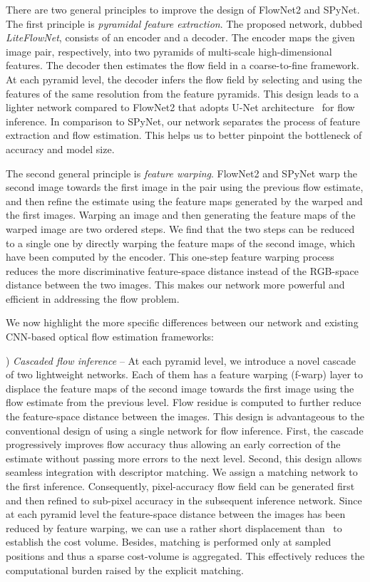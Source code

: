 \documentclass[10pt,twocolumn,letterpaper]{article}
\begin{document}
There are two general principles to improve the design of FlowNet2 and SPyNet. 
%
The first principle is \textit{pyramidal feature extraction}. The proposed network, dubbed \textit{LiteFlowNet}, consists of an encoder and a decoder. The encoder maps the given image pair, respectively, into two pyramids of multi-scale high-dimensional features. 
%
The decoder then estimates the flow field in a coarse-to-fine framework. At each pyramid level, the decoder infers the flow field by selecting and using the features of the same resolution from the feature pyramids.
%
This design leads to a lighter network compared to FlowNet2 that adopts U-Net architecture~\cite{Ronneberger15} for flow inference. In comparison to SPyNet, our network separates the process of feature extraction and flow estimation. This helps us to better pinpoint the bottleneck of accuracy and model size.

The second general principle is \textit{feature warping}.
%
FlowNet2 and SPyNet warp the second image towards the first image in the pair using the previous flow estimate, and then refine the estimate using the feature maps generated by the warped and the first images. Warping an image and then generating the feature maps of the warped image are two ordered steps. We find that the two steps can be reduced to a single one by directly warping the feature maps of the second image, which have been computed by the encoder. This one-step feature warping process reduces the more discriminative feature-space distance instead of the RGB-space distance between the two images. This makes our network more powerful and efficient in addressing the flow problem.

We now highlight the more specific differences between our network and existing CNN-based optical flow estimation frameworks: 

) \textit{Cascaded flow inference} -- 
%
At each pyramid level, we introduce a novel cascade of two lightweight networks. Each of them has a feature warping (f-warp) layer to displace the feature maps of the second image towards the first image using the flow estimate from the previous level. Flow residue is computed to further reduce the feature-space distance between the images.
%
This design is advantageous to the conventional design of using a single network for flow inference. 
%
First, the cascade progressively improves flow accuracy thus allowing an early correction of the estimate without passing more errors to the next level.
%
Second, this design allows seamless integration with descriptor matching. We assign a matching network to the first inference. Consequently, pixel-accuracy flow field can be generated first and then refined to sub-pixel accuracy in the subsequent inference network.
% 
Since at each pyramid level the feature-space distance between the images has been reduced by feature warping, we can use a rather short displacement than~\cite{Fischer15, Ilg17} to establish the cost volume. Besides, matching is performed only at sampled positions and thus a sparse cost-volume is aggregated. This effectively reduces the computational burden raised by the explicit matching. 
\end{document}
